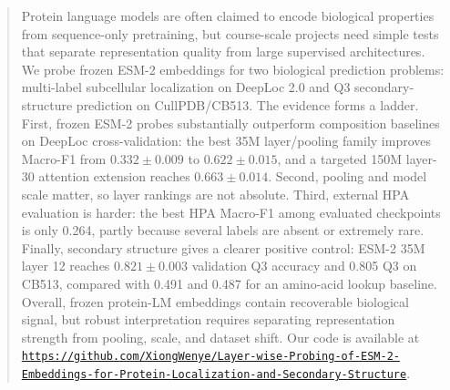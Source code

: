 \documentclass{article}
\begin{document}

\printAffiliationsAndNotice{}

\begin{abstract}
Protein language models are often claimed to encode biological properties from sequence-only pretraining, but course-scale projects need simple tests that separate representation quality from large supervised architectures. We probe frozen ESM-2 embeddings for two biological prediction problems: multi-label subcellular localization on DeepLoc 2.0 and Q3 secondary-structure prediction on CullPDB/CB513. The evidence forms a ladder. First, frozen ESM-2 probes substantially outperform composition baselines on DeepLoc cross-validation: the best 35M layer/pooling family improves Macro-F1 from $0.332 \pm 0.009$ to $0.622 \pm 0.015$, and a targeted 150M layer-30 attention extension reaches $0.663 \pm 0.014$. Second, pooling and model scale matter, so layer rankings are not absolute. Third, external HPA evaluation is harder: the best HPA Macro-F1 among evaluated checkpoints is only 0.264, partly because several labels are absent or extremely rare. Finally, secondary structure gives a clearer positive control: ESM-2 35M layer 12 reaches $0.821 \pm 0.003$ validation Q3 accuracy and 0.805 Q3 on CB513, compared with 0.491 and 0.487 for an amino-acid lookup baseline. Overall, frozen protein-LM embeddings contain recoverable biological signal, but robust interpretation requires separating representation strength from pooling, scale, and dataset shift. Our code is available at \href{https://github.com/XiongWenye/Layer-wise-Probing-of-ESM-2-Embeddings-for-Protein-Localization-and-Secondary-Structure}{\texttt{https://github.com/XiongWenye/}\allowbreak\texttt{Layer-wise-Probing-of-ESM-2-}\allowbreak\texttt{Embeddings-for-Protein-}\allowbreak\texttt{Localization-and-Secondary-}\allowbreak\texttt{Structure}}.
\end{abstract}
\end{document}
